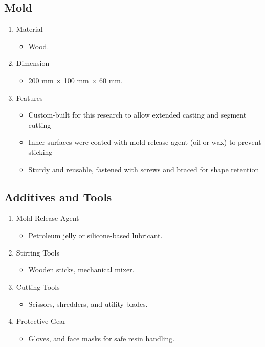 \subsection{Mold}
\begin{enumerate}
    \item Material
    \begin{itemize}
        \item Wood. 
    \end{itemize}
    \item Dimension
    \begin{itemize}
        \item 200 mm × 100 mm × 60 mm. 
    \end{itemize}
    \item  Features
    \begin{itemize}
        \item Custom-built for this research to allow extended casting and segment cutting 
        \item Inner surfaces were coated with mold release agent (oil or wax) to prevent sticking 
        \item Sturdy and reusable, fastened with screws and braced for shape retention 
    \end{itemize}
\end{enumerate}

\subsection{Additives and Tools}
\begin{enumerate}
    \item  Mold Release Agent 
    \begin{itemize}
        \item Petroleum jelly or silicone-based lubricant. 
    \end{itemize}
    \item Stirring Tools 
    \begin{itemize}
        \item Wooden sticks, mechanical mixer.  
    \end{itemize}
    \item  Cutting Tools 
    \begin{itemize}
        \item Scissors, shredders, and utility blades.
    \end{itemize}
    \item  Protective Gear 
    \begin{itemize}
        \item Gloves, and face masks for safe resin handling.
    \end{itemize}
\end{enumerate}
